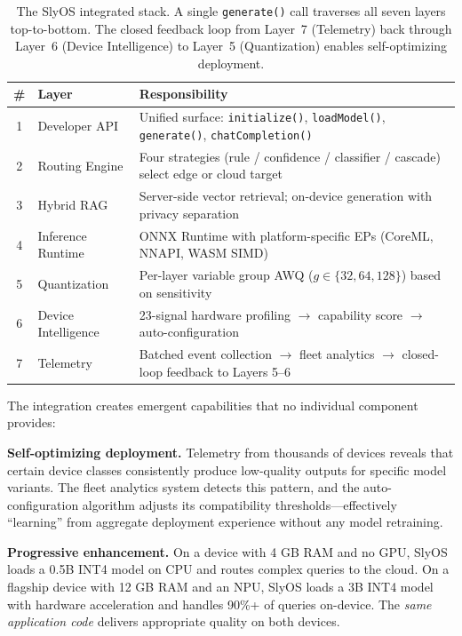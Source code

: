 \documentclass[12pt, letterpaper, twoside]{report}
\begin{document}
\begin{table}[H]
\centering
\caption[The SlyOS integrated stack layers and their responsibilities]{The SlyOS integrated stack. A single \texttt{generate()} call traverses all seven layers top-to-bottom. The closed feedback loop from Layer~7 (Telemetry) back through Layer~6 (Device Intelligence) to Layer~5 (Quantization) enables self-optimizing deployment.}
\label{fig:integrated_stack}
{\small
\begin{tabularx}{\textwidth}{@{}clX@{}}
\toprule
\textbf{\#} & \textbf{Layer} & \textbf{Responsibility} \\
\midrule
1 & Developer API & Unified surface: \texttt{initialize()}, \texttt{loadModel()}, \texttt{generate()}, \texttt{chatCompletion()} \\
2 & Routing Engine & Four strategies (rule / confidence / classifier / cascade) select edge or cloud target \\
3 & Hybrid RAG & Server-side vector retrieval; on-device generation with privacy separation \\
4 & Inference Runtime & ONNX Runtime with platform-specific EPs (CoreML, NNAPI, WASM SIMD) \\
5 & Quantization & Per-layer variable group AWQ ($g \in \{32, 64, 128\}$) based on sensitivity \\
6 & Device Intelligence & 23-signal hardware profiling $\to$ capability score $\to$ auto-configuration \\
7 & Telemetry & Batched event collection $\to$ fleet analytics $\to$ closed-loop feedback to Layers 5--6 \\
\bottomrule
\end{tabularx}
}
\end{table}

The integration creates emergent capabilities that no individual component provides:

\textbf{Self-optimizing deployment.} Telemetry from thousands of devices reveals that certain device classes consistently produce low-quality outputs for specific model variants. The fleet analytics system detects this pattern, and the auto-configuration algorithm adjusts its compatibility thresholds---effectively ``learning'' from aggregate deployment experience without any model retraining.

\textbf{Progressive enhancement.} On a device with 4 GB RAM and no GPU, SlyOS loads a 0.5B INT4 model on CPU and routes complex queries to the cloud. On a flagship device with 12 GB RAM and an NPU, SlyOS loads a 3B INT4 model with hardware acceleration and handles 90\%+ of queries on-device. The \textit{same application code} delivers appropriate quality on both devices.
\end{document}
